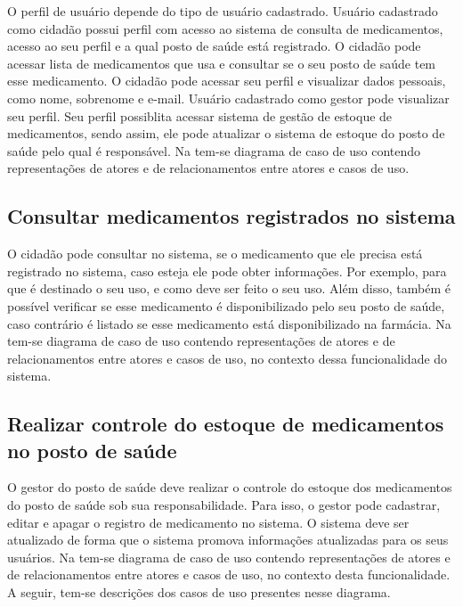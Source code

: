 O perfil de usuário depende do tipo de usuário cadastrado. Usuário  cadastrado como cidadão possui perfil com acesso ao sistema de consulta de medicamentos, acesso ao seu perfil e a qual posto de saúde está registrado. O cidadão pode acessar lista de medicamentos que usa e consultar se o seu posto de saúde tem esse medicamento. O cidadão pode acessar seu perfil e visualizar dados pessoais, como nome, sobrenome e e-mail. Usuário cadastrado como gestor pode visualizar seu perfil. Seu perfil possiblita acessar sistema de gestão de estoque de medicamentos, sendo assim, ele pode atualizar o sistema de estoque do posto de saúde pelo qual é responsável. Na  tem-se diagrama de caso de uso contendo representações de atores e de relacionamentos entre atores e casos de uso.


%

\subsection{Consultar medicamentos registrados no sistema}

O cidadão pode consultar no sistema, se o medicamento que ele precisa está registrado no sistema, caso esteja ele pode obter informações. Por exemplo, para que é destinado o seu uso, e como deve ser feito o seu uso. Além disso, também é possível verificar se esse medicamento é disponibilizado pelo seu posto de saúde, caso contrário é listado se esse medicamento está disponibilizado na farmácia. Na  tem-se diagrama de caso de uso contendo representações de atores e de relacionamentos entre atores e casos de uso, no contexto dessa funcionalidade do sistema.

%


\subsection{Realizar controle do estoque de medicamentos no posto de saúde}

O gestor do posto de saúde deve realizar o controle do estoque dos medicamentos do posto de saúde sob sua responsabilidade. Para isso, o gestor pode cadastrar, editar e apagar o registro de medicamento no sistema. O sistema deve ser atualizado de forma que o sistema promova informações atualizadas para os seus usuários. Na  tem-se diagrama de caso de uso contendo representações de atores e de relacionamentos entre atores e casos de uso, no contexto desta funcionalidade. A seguir, tem-se descrições dos casos de uso presentes nesse diagrama.


